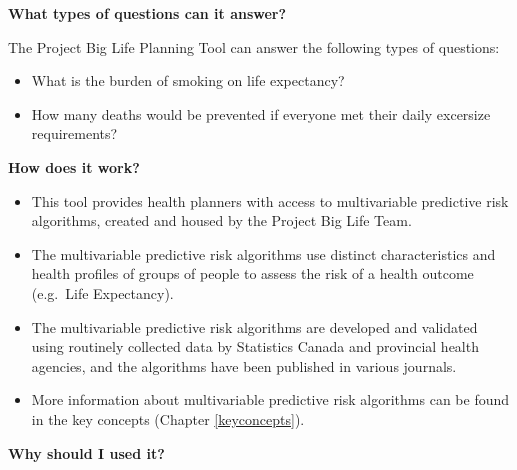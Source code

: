 \documentclass[]{book}
\providecommand{\tightlist}{%
  \setlength{\itemsep}{0pt}\setlength{\parskip}{0pt}}
\begin{document}
\textbf{What types of questions can it answer?}

The Project Big Life Planning Tool can answer the following types of
questions:

\begin{itemize}
\tightlist
\item
  What is the burden of smoking on life expectancy?
\item
  How many deaths would be prevented if everyone met their daily
  excersize requirements?
\end{itemize}

\textbf{How does it work?}

\begin{itemize}
\item
  This tool provides health planners with access to multivariable
  predictive risk algorithms, created and housed by the Project Big Life
  Team.
\item
  The multivariable predictive risk algorithms use distinct
  characteristics and health profiles of groups of people to assess the
  risk of a health outcome (e.g.~Life Expectancy).
\item
  The multivariable predictive risk algorithms are developed and
  validated using routinely collected data by Statistics Canada and
  provincial health agencies, and the algorithms have been published in
  various journals.
\item
  More information about multivariable predictive risk algorithms can be
  found in the key concepts (Chapter \ref{keyconcepts}).
\end{itemize}

\textbf{Why should I used it?}
\end{document}
